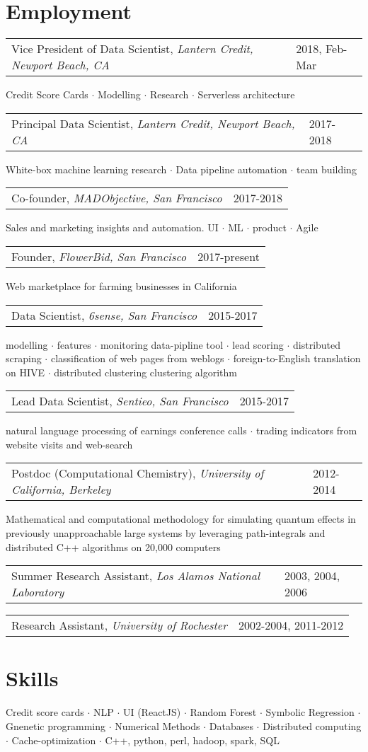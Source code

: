 \documentclass{res}
\makeatletter
\newcommand{\af}[3]{
\begin{tabular*}{\textwidth}[t]{@{}p{5.2in} l} 
    #1, \textit{#2} & #3\\
  \end{tabular*}
}
\newcommand{\aff}[4]{
\begin{tabular*}{\textwidth}[t]{@{}p{5.2in} l} 
    #1, \textit{#2} & #3\\
  \end{tabular*}
  {\color[RGB]{106,106,106} #4}\\
}
\makeatother
\begin{document}
 


\address{
  1632 Walnut St.\\
  Berkeley, CA 94709 \\
}
\address{
  (585) 313-6024\\
  kirill.igum@gmail.com\\
  \url{www.linkedin.com/in/kirilligum}
}

\begin{resume}

\section{Employment}
\aff{Vice President of Data Scientist}{Lantern Credit, Newport Beach, CA}{2018, Feb-Mar}{ 
	Credit Score Cards $\cdot$ Modelling $\cdot$ Research $\cdot$ Serverless architecture
} 
\aff{Principal Data Scientist}{Lantern Credit, Newport Beach, CA}{2017-2018}{ 
	White-box machine learning research $\cdot$ Data pipeline automation $\cdot$ team building
} 
\aff{Co-founder}{MADObjective, San Francisco}{2017-2018}{ 
	Sales and marketing insights and automation. UI $\cdot$ ML $\cdot$ product $\cdot$ Agile
} 
\aff{Founder}{FlowerBid, San Francisco}{2017-present}{ 
	Web marketplace for farming businesses in California
} 
\aff{Data Scientist}{6sense, San Francisco}{2015-2017}{ 
	modelling $\cdot$ 
	features $\cdot$  
	monitoring data-pipline tool $\cdot$ 
	lead scoring $\cdot$
	distributed scraping $\cdot$
	classification of web pages from weblogs $\cdot$
	foreign-to-English translation on HIVE $\cdot$
	distributed clustering clustering algorithm
} 
\aff{Lead Data Scientist}{Sentieo, San Francisco}{2015-2017}{ 
	natural language processing of earnings conference calls $\cdot$ trading indicators from website visits and web-search
} 
\aff{Postdoc (Computational Chemistry)}{University of California, Berkeley}{2012-2014}{ 
  Mathematical and computational methodology for simulating quantum effects in previously unapproachable large systems by leveraging path-integrals and distributed C++ algorithms on 20,000 computers
} 
\af{Summer Research Assistant}{Los Alamos National Laboratory}{2003, 2004, 2006}
\af{Research Assistant}{University of Rochester}{2002-2004, 2011-2012}
 
\section{Skills}
	Credit score cards $\cdot$
	NLP $\cdot$
	UI (ReactJS) $\cdot$
	Random Forest $\cdot$
	Symbolic Regression $\cdot$
	Gnenetic programming $\cdot$
	Numerical Methods $\cdot$
	Databases $\cdot$
	Distributed computing $\cdot$
	Cache-optimization $\cdot$
	C++, python, perl, hadoop, spark, SQL


\end{resume}
\end{document}
